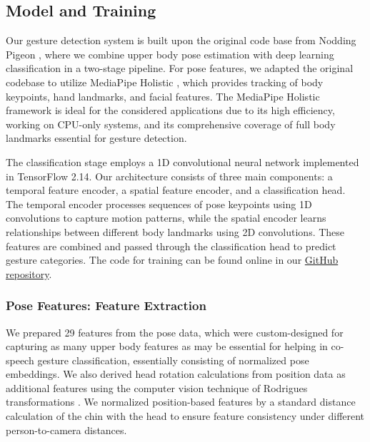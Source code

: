 \documentclass[11pt,headings=small,cleardoublepage=empty,tocflat,numbers=noenddot,twoside,captions=tableheading]{scrbook}
\begin{document}
\begin{refsection}
\subsection{Model and Training}
Our gesture detection system is built upon the original code base from Nodding Pigeon \parencite{yungNoddingPigeonHttps2022}, where we combine upper body pose estimation with deep learning classification in a two-stage pipeline. For pose features, we adapted the original codebase to utilize MediaPipe Holistic \parencite{lugaresiMediaPipeFrameworkBuilding2019}, which provides tracking of body keypoints, hand landmarks, and facial features. The MediaPipe Holistic framework is ideal for the considered applications due to its high efficiency, working on CPU-only systems, and its comprehensive coverage of full body landmarks essential for gesture detection. 

The classification stage employs a 1D convolutional neural network implemented in TensorFlow 2.14. Our architecture consists of three main components: a temporal feature encoder, a spatial feature encoder, and a classification head. The temporal encoder processes sequences of pose keypoints using 1D convolutions to capture motion patterns, while the spatial encoder learns relationships between different body landmarks using 2D convolutions. These features are combined and passed through the classification head to predict gesture categories. The code for training can be found online in our \href{https://github.com/WimPouw/envisionhgdetector/blob/main/training/Trainingcode/training_only_terminal_with_statistics_fullrun_largebatchaugmentationv11.py}{GitHub repository}.

\subsubsection{Pose Features: Feature Extraction}
We prepared 29 features from the pose data, which were custom-designed for capturing as many upper body features as may be essential for helping in co-speech gesture classification, essentially consisting of normalized pose embeddings. We also derived head rotation calculations from position data as additional features using the computer vision technique of Rodrigues transformations \parencite{pouwWimPouwsEnvisionBOX2024, thierfelderHeadPoseEstimation2023}. We normalized position-based features by a standard distance calculation of the chin with the head to ensure feature consistency under different person-to-camera distances.


\end{refsection}
\end{document}
